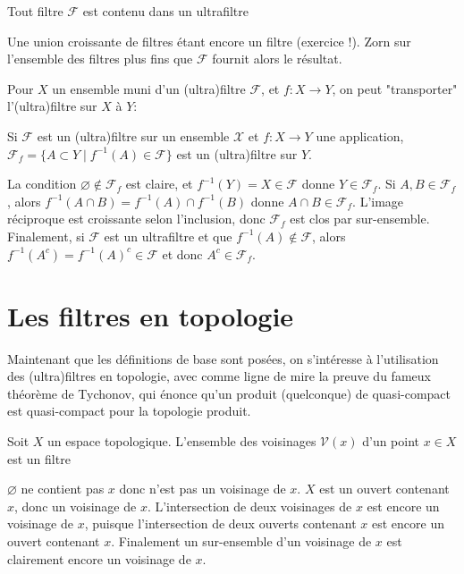 \documentclass{article}
\begin{document}
\begin{proposition}
    Tout filtre $\mathcal{F}$ est contenu dans un ultrafiltre
\end{proposition}

\begin{preuve}
    Une union croissante de filtres étant encore un filtre (exercice !). Zorn sur l'ensemble des filtres plus fins que $\mathcal{F}$ fournit alors le résultat.\\
\end{preuve}

Pour $X$ un ensemble muni d'un (ultra)filtre $\mathcal{F}$, et $f: X \to Y$, on peut "transporter" l'(ultra)filtre sur $X$ à $Y$:
\begin{proposition}
    Si $\mathcal{F}$ est un (ultra)filtre sur un ensemble $\mathcal{X}$ et $f: X \to Y$ une application, $\mathcal{F}_f = \{A \subset Y \mid f^{-1}(A) \in \mathcal{F}\}$ est un (ultra)filtre sur $Y$.
\end{proposition}

\begin{preuve}
    La condition $\varnothing \not\in \mathcal{F}_f$ est claire, et $f^{-1}(Y) = X \in \mathcal{F}$ donne $Y \in \mathcal{F}_f$. Si $A, B \in \mathcal{F}_f$, alors $f^{-1}(A \cap B) = f^{-1}(A) \cap f^{-1}(B)$ donne $A \cap B \in \mathcal{F}_f$. L'image réciproque est croissante selon l'inclusion, donc $\mathcal{F}_f$ est clos par sur-ensemble. Finalement, si $\mathcal{F}$ est un ultrafiltre et que $f^{-1}(A) \not \in \mathcal{F}$, alors $f^{-1}(A^c) = f^{-1}(A)^c \in \mathcal{F}$ et donc $A^c \in \mathcal{F}_f$.
\end{preuve}

\section{Les filtres en topologie}
Maintenant que les définitions de base sont posées, on s'intéresse à l'utilisation des (ultra)filtres en topologie, avec comme ligne de mire la preuve du fameux théorème de Tychonov, qui énonce qu'un produit (quelconque) de quasi-compact est quasi-compact pour la topologie produit.
\begin{proposition}
    Soit $X$ un espace topologique. L'ensemble des voisinages $\mathcal{V}(x)$ d'un point $x \in X$ est un filtre
\end{proposition}
\begin{preuve}
    $\varnothing$ ne contient pas $x$ donc n'est pas un voisinage de $x$. $X$ est un ouvert contenant $x$, donc un voisinage de $x$. L'intersection de deux voisinages de $x$ est encore un voisinage de $x$, puisque l'intersection de deux ouverts contenant $x$ est encore un ouvert contenant $x$. Finalement un sur-ensemble d'un voisinage de $x$ est clairement encore un voisinage de $x$.\\
\end{preuve}
\end{document}
